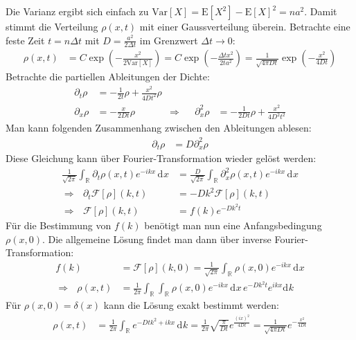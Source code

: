 \documentclass[a4paper,12pt]{article}
\newcommand{\intr}{}
\newcommand{\kla}{}
\newcommand{\klam}{}
\newcommand{\tecxt}{}
\begin{document}
Die Varianz ergibt sich einfach zu $\tecxt\text{Var}\klam\left[ {X} \right]=\tecxt\text{E}\klam\left[ {X^2} \right]-\tecxt\text{E}\klam\left[ {X} \right]^2=na^2$. Damit stimmt die Verteilung $\rho(x,t)$ mit einer Gaussverteilung überein. Betrachte eine feste Zeit $t=n\Delta t$ mit $D=\frac{a^2}{2\Delta t}$ im Grenzwert $\Delta t\rightarrow 0$:
\begin{align*}
\rho (x,t)&=C\exp\kla\left( {-\frac{x^2}{2\tecxt\text{Var}\klam\left[ {X} \right]}} \right)=C\exp\kla\left( {-\frac{\Delta tx^2}{2ta^2}} \right)=\frac{1}{\sqrt{4\pi Dt}}\exp\kla\left( {-\frac{x^2}{4Dt}} \right)
\end{align*}
Betrachte die partiellen Ableitungen der Dichte:
\begin{align*}
\partial_t\rho&=-\frac{1}{2t}\rho+\frac{x^2}{4Dt^2}\rho\\
\partial_x\rho&=-\frac{x}{2Dt}\rho &\Rightarrow &&\partial_x^2\rho &=-\frac{1}{2Dt}\rho+\frac{x^2}{4D^2t^2}
\end{align*}
Man kann folgenden Zusammenhang zwischen den Ableitungen ablesen:
\begin{align*}
\partial_t\rho &=D\partial_x^2\rho
\end{align*}
Diese Gleichung kann über Fourier-Transformation wieder gelöst werden:
\begin{align*}
\frac{1}{\sqrt{2\pi}}\intr\int_{\mathbb{R}^{ }}{\partial_t\rho(x,t) e^{-ikx}}\,\mathrm{d}^{ }x&=\frac{D}{\sqrt{2\pi}}\intr\int_{\mathbb{R}^{ }}{\partial_x^2\rho(x,t)e^{-ikx}}\,\mathrm{d}^{ }x\\
\Rightarrow\ \ \ \partial_t\mathcal{F}[\rho](k,t)&=-Dk^2\mathcal{F}[\rho](k,t)\\
\Rightarrow\ \ \ \mathcal{F}[\rho](k,t)&=f(k)e^{-Dk^2t}
\end{align*}
Für die Bestimmung von $f(k)$ benötigt man nun eine Anfangsbedingung $\rho(x,0)$. Die allgemeine Lösung findet man dann über inverse Fourier-Transformation:
\begin{align*}
f(k)&=\mathcal{F}[\rho](k,0)=\frac{1}{\sqrt{2\pi}}\intr\int_{\mathbb{R}^{ }}{\rho(x,0)e^{-ikx}}\,\mathrm{d}^{ }x\\
\Rightarrow\ \ \ \rho(x,t)&=\frac{1}{2\pi}\intr\int_{\mathbb{R}^{ }}\intr\int_{\mathbb{R}^{ }}{\rho(x,0)e^{-ikx}}\,\mathrm{d}^{ }x\,e^{-Dk^2t}e^{ikx}\mathrm{d}^{ }k
\end{align*}
Für $\rho(x,0)=\delta (x)$ kann die Lösung exakt bestimmt werden:
\begin{align*}
\rho(x,t)&=\frac{1}{2\pi}\intr\int_{\mathbb{R}^{ }}{e^{-Dtk^2+ikx}}\,\mathrm{d}^{ }k=\frac{1}{2\pi}\sqrt{\frac{\pi}{Dt}}e^{\frac{(ix)^2}{4Dt}}=\frac{1}{\sqrt{4\pi Dt}}e^{-\frac{x^2}{4Dt}}
\end{align*}
\end{document}
